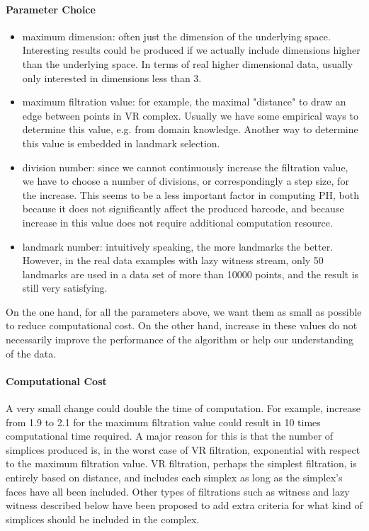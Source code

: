 \documentclass[10pt,a4paper]{article}
\begin{document}
\paragraph{Parameter Choice }
\begin{itemize}
	\item maximum dimension: often just the dimension of the underlying space. Interesting results could be produced if we actually include dimensions higher than the underlying space. In terms of real higher dimensional data, usually only interested in dimensions less than 3.
	\item maximum filtration value: for example, the maximal "distance" to draw an edge between points in VR complex. Usually we have some empirical ways to determine this value, e.g. from domain knowledge. Another way to determine this value is embedded in landmark selection.
	\item division number: since we cannot continuously increase the filtration value, we have to choose a number of divisions, or correspondingly a step size, for the increase. This seems to be a less important factor in computing PH, both because it does not significantly affect the produced barcode, and because increase in this value does not require additional computation resource.
	\item landmark number: intuitively speaking, the more landmarks the better. However, in the real data examples with lazy witness stream, only 50 landmarks are used in a data set of more than 10000 points, and the result is still very satisfying. 
\end{itemize}
On the one hand, for all the parameters above, we want them as small as possible to reduce computational cost. On the other hand, increase in these values do not necessarily improve the performance of the algorithm or help our understanding of the data.

\paragraph{Computational Cost}
A very small change could double the time of computation. For example, increase from 1.9 to 2.1 for the maximum filtration value could result in 10 times computational time required. A major reason for this is that the number of simplices produced is, in the worst case of VR filtration, exponential with respect to the maximum filtration value. VR filtration, perhaps the simplest filtration, is entirely based on distance, and includes each simplex as long as the simplex's faces have all been included. Other types of filtrations such as witness and lazy witness described below have been proposed to add extra criteria for what kind of simplices should be included in the complex.
\end{document}
